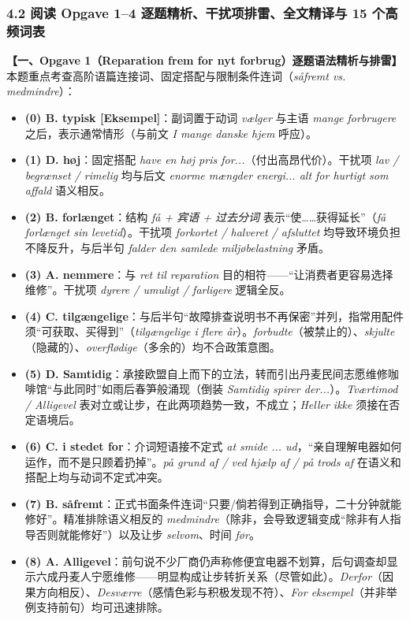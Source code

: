 \subsubsection*{4.2 阅读 Opgave 1--4 逐题精析、干扰项排雷、全文精译与 15 个高频词表}

\begin{answerbox}
\textbf{\color{NCDNavy}【一、Opgave 1（Reparation frem for nyt forbrug）逐题语法精析与排雷】}\\
{\small 本题重点考查高阶语篇连接词、固定搭配与限制条件连词（\textit{såfremt vs. medmindre}）：}
\begin{itemize}
  \item \textbf{(0) B. typisk [Eksempel]}：副词置于动词 \textit{vælger} 与主语 \textit{mange forbrugere} 之后，表示通常情形（与前文 \textit{I mange danske hjem} 呼应）。
  \item \textbf{(1) D. høj}：固定搭配 \textit{have en høj pris for...}（付出高昂代价）。干扰项 \textit{lav / begrænset / rimelig} 均与后文 \textit{enorme mængder energi... alt for hurtigt som affald} 语义相反。
  \item \textbf{(2) B. forlænget}：结构 \textit{få + 宾语 + 过去分词} 表示“使……获得延长”（\textit{få forlænget sin levetid}）。干扰项 \textit{forkortet / halveret / afsluttet} 均导致环境负担不降反升，与后半句 \textit{falder den samlede miljøbelastning} 矛盾。
  \item \textbf{(3) A. nemmere}：与 \textit{ret til reparation} 目的相符——“让消费者更容易选择维修”。干扰项 \textit{dyrere / umuligt / farligere} 逻辑全反。
  \item \textbf{(4) C. tilgængelige}：与后半句“故障排查说明书不再保密”并列，指常用配件须“可获取、买得到”（\textit{tilgængelige i flere år}）。\textit{forbudte}（被禁止的）、\textit{skjulte}（隐藏的）、\textit{overflødige}（多余的）均不合政策意图。
  \item \textbf{(5) D. Samtidig}：承接欧盟自上而下的立法，转而引出丹麦民间志愿维修咖啡馆“与此同时”如雨后春笋般涌现（倒装 \textit{Samtidig spirer der...}）。\textit{Tværtimod / Alligevel} 表对立或让步，在此两项趋势一致，不成立；\textit{Heller ikke} 须接在否定语境后。
  \item \textbf{(6) C. i stedet for}：介词短语接不定式 \textit{at smide ... ud}，“亲自理解电器如何运作，而不是只顾着扔掉”。\textit{på grund af / ved hjælp af / på trods af} 在语义和搭配上均与动词不定式冲突。
  \item \textbf{(7) B. såfremt}：正式书面条件连词“只要/倘若得到正确指导，二十分钟就能修好”。精准排除语义相反的 \textit{medmindre}（除非，会导致逻辑变成“除非有人指导否则就能修好”）以及让步 \textit{selvom}、时间 \textit{før}。
  \item \textbf{(8) A. Alligevel}：前句说不少厂商仍声称修便宜电器不划算，后句调查却显示六成丹麦人宁愿维修——明显构成让步转折关系（尽管如此）。\textit{Derfor}（因果方向相反）、\textit{Desværre}（感情色彩与积极发现不符）、\textit{For eksempel}（并非举例支持前句）均可迅速排除。
\end{itemize}
\end{answerbox}

